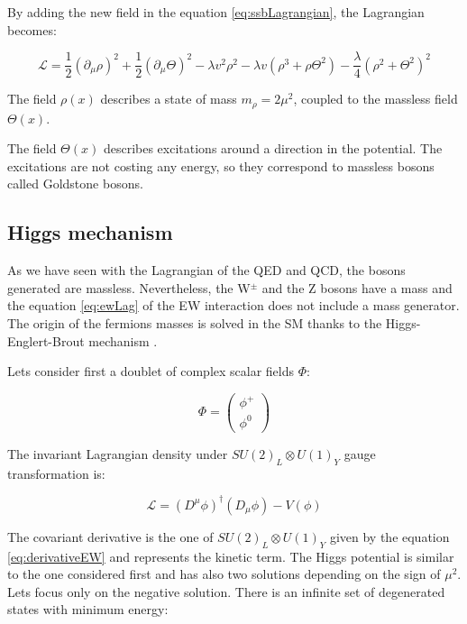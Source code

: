     By adding the new field in the equation \ref{eq:ssbLagrangian}, the Lagrangian becomes:

    \begin{equation}
      \mathcal{L} = \frac{1}{2} (\partial_{\mu}\rho)^2 + \frac{1}{2}(\partial_{\mu}\Theta)^2 - \lambda v^2 \rho^2 - \lambda v (\rho^3 +\rho \Theta^2) - \frac{\lambda}{4}(\rho^2 + \Theta^2)^2
    \end{equation}

    The field $\rho(x)$ describes a state of mass $m_{\rho} = 2 \mu^2$, coupled to the massless field $\Theta(x)$.

    The field $\Theta(x)$ describes excitations around a direction in the potential.
    The excitations are not costing any energy, so they correspond to massless bosons called Goldstone bosons.


    \subsection{Higgs mechanism}
    \label{sec:higgsMechanism}

    As we have seen with the Lagrangian of the QED and QCD, the bosons generated are massless. Nevertheless, the W$^{\pm}$ and the Z bosons have a mass and the equation \ref{eq:ewLag} of the EW interaction does not include a mass generator. 
    The origin of the fermions masses is solved in the \acrshort{SM} thanks to the Higgs-Englert-Brout mechanism \cite{PhysRevLett.13.508}\cite{1964PhRvL..13..321E}.

    Lets consider first a doublet of complex scalar fields $\Phi$:
    
    \begin{equation}
       \Phi = \begin{pmatrix}
                \phi^{+}\\
                \phi^{0}
              \end{pmatrix}
    \end{equation}

     The invariant Lagrangian density under $SU(2)_L \otimes U(1)_Y$ gauge transformation is:

    \begin{equation}
      \mathcal{L} = \left(D^{\mu} \phi \right)^{\dagger} \left( D_{\mu} \phi \right) - V(\phi)
      \label{eq:lagrangianHiggs}
    \end{equation}    
    
    The covariant derivative is the one of $SU(2)_L \otimes U(1)_Y$ given by the equation \ref{eq:derivativeEW} and represents the kinetic term.
    The Higgs potential is similar to the one considered first and has also two solutions depending on the sign of $\mu^2$.
    Lets focus only on the negative solution. 
    There is an infinite set of degenerated states with minimum energy:

